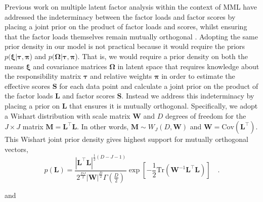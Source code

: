 \documentclass[twocolumn]{aastex62}
\newcommand{\todo}[1]{\textcolor{red}{#1}}
\newcommand{\vect}[1]{\boldsymbol{\mathbf{#1}}}
\renewcommand{\vec}[1]{\vect{#1}}
\newcommand{\weight}{\pi}
\newcommand{\data}{\textbf{Y}}
\newcommand{\vecdata}{\vec\data}
\newcommand{\diag}[1]{\textrm{diag}(#1)}
\newcommand{\transpose}{^\intercal}
\newcommand{\factorloads}{\textbf{L}}
\newcommand{\factorscores}{\textbf{S}}
\newcommand{\specificvariance}{\vec{D}}
\newcommand{\scoremeans}{\vec\xi}
\newcommand{\scorecovs}{\vec\Omega}
\newcommand{\NumDimensions}{D}
\newcommand{\NumLatentFactors}{J}
\newcommand{\likelihood}{\mathcal{L}}
\begin{document}
Previous work on multiple latent factor analysis within the context of MML have
addressed the indeterminacy between the factor loads and factor scores by
placing a joint prior on the product of factor loads and scores, whilst
ensuring that the factor loads themselves remain mutually orthogonal \citep{WallaceMLF}.
Adopting the same prior density in our model is not practical because 
it would require the priors $p(\scoremeans|\vec\tau,\vec\weight$) and $p(\scorecovs|\vec\tau,\vec\weight$).
That is, we would require a prior density on both the means $\scoremeans$
and covariance matrices $\scorecovs$ in latent space that requires knowledge
about the responsibility matrix $\vec\tau$ and relative weights $\vec\weight$ in order to estimate the effective scores
$\factorscores$ for each data point and calculate a joint prior on the product
of the factor loads $\factorloads$ and factor scores $\factorscores$.
Instead we address this indeterminacy
by placing a prior on $\factorloads$ that ensures it is mutually orthogonal.
Specifically, we adopt a Wishart distribution with scale matrix $\vec{W}$
and $D$ degrees of freedom for the
$\NumLatentFactors\times\NumLatentFactors$ matrix $\vec{M} = \factorloads\transpose\factorloads$.
In other words, $\vec{M} \sim W_\NumLatentFactors(D,\vec{W})$
and $\vec{W} = \textrm{Cov}(\factorloads\transpose)$.
This
Wishart joint prior density gives highest support for mutually orthogonal vectors,
\begin{equation}
	p(\factorloads) = \frac{|\factorloads\transpose\factorloads|^{\frac{1}{2}(\NumDimensions - \NumLatentFactors - 1)}}{2^{\frac{\NumDimensions\NumLatentFactors}{2}}|\vec{W}|^{\frac{\NumDimensions}{2}}\Gamma(\frac{\NumDimensions}{2})}\exp\left[-\frac{1}{2}\textrm{Tr}(\vec{W}^{-1}\factorloads\transpose\factorloads)\right] \quad .
\end{equation}

\prntlen{\textheight}
and 
\prntlen{\textwidth}

\end{document}
